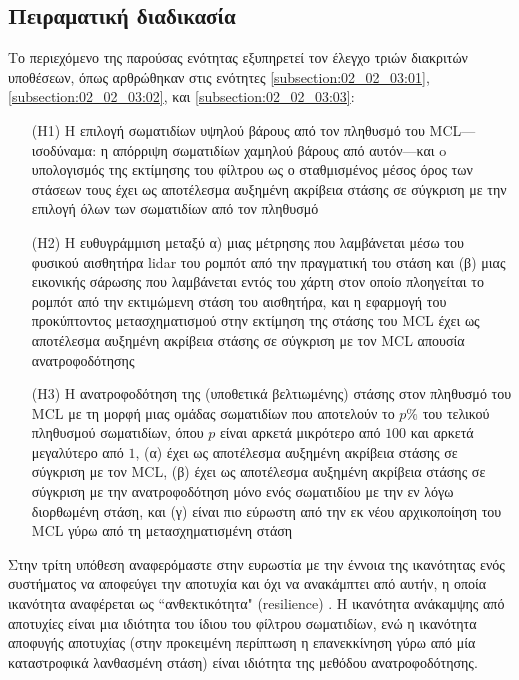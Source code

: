 \subsection{Πειραματική διαδικασία}
\label{subsection:02_02_04:01}

Το περιεχόμενο της παρούσας ενότητας εξυπηρετεί τον έλεγχο τριών διακριτών
υποθέσεων, όπως αρθρώθηκαν στις ενότητες
\ref{subsection:02_02_03:01}, \ref{subsection:02_02_03:02}, και
\ref{subsection:02_02_03:03}:

\begin{enumerate}
  \item[(H1)] Η επιλογή σωματιδίων υψηλού βάρους από τον πληθυσμό του
        MCL---ισοδύναμα: η απόρριψη σωματιδίων χαμηλού βάρους από αυτόν---και o
        υπολογισμός της εκτίμησης του φίλτρου ως ο σταθμισμένος μέσος όρος
        των στάσεων τους έχει ως αποτέλεσμα αυξημένη ακρίβεια στάσης σε σύγκριση
        με την επιλογή όλων των σωματιδίων από τον πληθυσμό
  \item[(H2)] Η ευθυγράμμιση μεταξύ α) μιας μέτρησης που λαμβάνεται μέσω του
        φυσικού αισθητήρα lidar του ρομπότ από την πραγματική του στάση και
        (β) μιας εικονικής σάρωσης που λαμβάνεται εντός του χάρτη στον οποίο
        πλοηγείται το ρομπότ από την εκτιμώμενη στάση του αισθητήρα, και η
        εφαρμογή του προκύπτοντος μετασχηματισμού στην εκτίμηση της στάσης του
        MCL έχει ως αποτέλεσμα αυξημένη ακρίβεια στάσης σε σύγκριση με τον MCL
        απουσία ανατροφοδότησης
  \item[(H3)] Η ανατροφοδότηση της (υποθετικά βελτιωμένης) στάσης στον πληθυσμό
        του MCL με τη μορφή μιας ομάδας σωματιδίων που αποτελούν το $p\%$ του
        τελικού πληθυσμού σωματιδίων, όπου $p$ είναι αρκετά μικρότερο από $100$
        και αρκετά μεγαλύτερο από $1$, (α) έχει ως αποτέλεσμα αυξημένη ακρίβεια
        στάσης σε σύγκριση με τον MCL, (β) έχει ως αποτέλεσμα αυξημένη ακρίβεια
        στάσης σε σύγκριση με την ανατροφοδότηση μόνο ενός σωματιδίου με την εν
        λόγω διορθωμένη στάση, και (γ) είναι πιο εύρωστη από την εκ νέου
        αρχικοποίηση του MCL γύρω από τη μετασχηματισμένη στάση
\end{enumerate}

Στην τρίτη υπόθεση αναφερόμαστε στην ευρωστία με την έννοια της ικανότητας ενός
συστήματος να αποφεύγει την αποτυχία και όχι να ανακάμπτει από αυτήν, η οποία
ικανότητα αναφέρεται ως ``ανθεκτικότητα" (resilience)
\cite{Zhu2011b,Tavana2011}. Η ικανότητα ανάκαμψης από αποτυχίες είναι μια
ιδιότητα του ίδιου του φίλτρου σωματιδίων, ενώ η ικανότητα αποφυγής αποτυχίας
(στην προκειμένη περίπτωση η επανεκκίνηση γύρω από μία καταστροφικά λανθασμένη
στάση) είναι ιδιότητα της μεθόδου ανατροφοδότησης.

